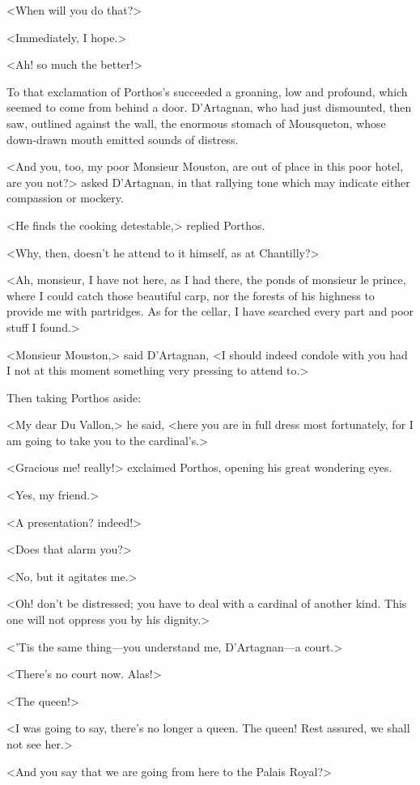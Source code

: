 <When will you do that?>

<Immediately, I hope.>

<Ah! so much the better!>

To that exclamation of Porthos's succeeded a groaning, low and profound, which seemed to come from behind a door. D'Artagnan, who had just dismounted, then saw, outlined against the wall, the enormous stomach of Mousqueton, whose down-drawn mouth emitted sounds of distress.

<And you, too, my poor Monsieur Mouston, are out of place in this poor hotel, are you not?> asked D'Artagnan, in that rallying tone which may indicate either compassion or mockery.

<He finds the cooking detestable,> replied Porthos.

<Why, then, doesn't he attend to it himself, as at Chantilly?>

<Ah, monsieur, I have not here, as I had there, the ponds of monsieur le prince, where I could catch those beautiful carp, nor the forests of his highness to provide me with partridges. As for the cellar, I have searched every part and poor stuff I found.>

<Monsieur Mouston,> said D'Artagnan, <I should indeed condole with you had I not at this moment something very pressing to attend to.>

Then taking Porthos aside:

<My dear Du Vallon,> he said, <here you are in full dress most fortunately, for I am going to take you to the cardinal's.>

<Gracious me! really!> exclaimed Porthos, opening his great wondering eyes.

<Yes, my friend.>

<A presentation? indeed!>

<Does that alarm you?>

<No, but it agitates me.>

<Oh! don't be distressed; you have to deal with a cardinal of another kind. This one will not oppress you by his dignity.>

<'Tis the same thing—you understand me, D'Artagnan—a court.>

<There's no court now. Alas!>

<The queen!>

<I was going to say, there's no longer a queen. The queen! Rest assured, we shall not see her.>

<And you say that we are going from here to the Palais Royal?>

